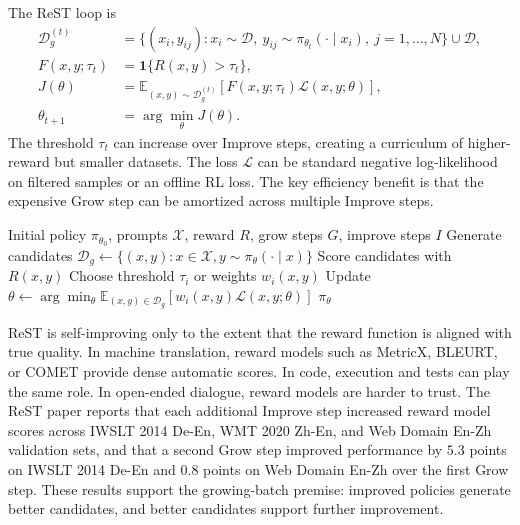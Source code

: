 The ReST loop is
\begin{align}
    \mathcal{D}_g^{(t)} &= \{(x_i,y_{ij}) : x_i\sim \mathcal{D},\ y_{ij}\sim \pi_{\theta_t}(\cdot\mid x_i),\ j=1,\ldots,N\}\cup\mathcal{D},\\
    F(x,y;\tau_t) &= \mathbf{1}\{R(x,y)>\tau_t\},\\
    J(\theta) &= \mathbb{E}_{(x,y)\sim\mathcal{D}_g^{(t)}}\left[F(x,y;\tau_t)\mathcal{L}(x,y;\theta)\right],\\
    \theta_{t+1} &= \arg\min_\theta J(\theta).
    \label{eq:rest-loss}
\end{align}
The threshold $\tau_t$ can increase over Improve steps, creating a curriculum of higher-reward but smaller datasets. The loss $\mathcal{L}$ can be standard negative log-likelihood on filtered samples or an offline RL loss. The key efficiency benefit is that the expensive Grow step can be amortized across multiple Improve steps.

\begin{algorithm}[t]
\caption{ReST / ReST-EM style self-training}
\label{alg:rest}
\begin{algorithmic}[1]
\Require Initial policy $\pi_{\theta_0}$, prompts $\mathcal{X}$, reward $R$, grow steps $G$, improve steps $I$
    \State Generate candidates $\mathcal{D}_g\gets\{(x,y):x\in\mathcal{X}, y\sim\pi_{\theta}(\cdot\mid x)\}$
    \State Score candidates with $R(x,y)$
        \State Choose threshold $\tau_i$ or weights $w_i(x,y)$
        \State Update $\theta\gets\arg\min_\theta \mathbb{E}_{(x,y)\in\mathcal{D}_g}[w_i(x,y)\mathcal{L}(x,y;\theta)]$
    \EndFor
\EndFor
\State \Return $\pi_\theta$
\end{algorithmic}
\end{algorithm}

ReST is self-improving only to the extent that the reward function is aligned with true quality. In machine translation, reward models such as MetricX, BLEURT, or COMET provide dense automatic scores. In code, execution and tests can play the same role. In open-ended dialogue, reward models are harder to trust. The ReST paper reports that each additional Improve step increased reward model scores across IWSLT 2014 De-En, WMT 2020 Zh-En, and Web Domain En-Zh validation sets, and that a second Grow step improved performance by $5.3$ points on IWSLT 2014 De-En and $0.8$ points on Web Domain En-Zh over the first Grow step. These results support the growing-batch premise: improved policies generate better candidates, and better candidates support further improvement.

